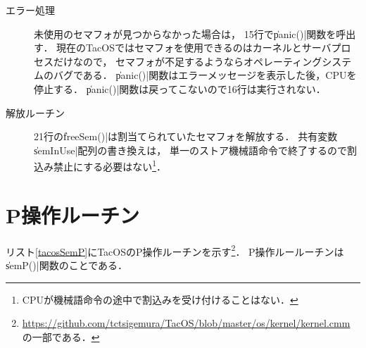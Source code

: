 \begin{description}
\item [エラー処理]
  未使用のセマフォが見つからなかった場合は，
  15行で\|panic()|関数を呼出す．
  現在のTacOSではセマフォを使用できるのはカーネルとサーバプロセスだけなので，
  セマフォが不足するようならオペレーティングシステムのバグである．
  \|panic()|関数はエラーメッセージを表示した後，CPUを停止する．
  \|panic()|関数は戻ってこないので16行は実行されない．

\item [解放ルーチン]
  21行の\|freeSem()|は割当てられていたセマフォを解放する．
  共有変数\|semInUse|配列の書き換えは，
  単一のストア機械語命令で終了するので割込み禁止にする必要はない\footnote{
    CPUが機械語命令の途中で割込みを受け付けることはない．}．
\end{description}

\section{P操作ルーチン}
リスト\ref{tacosSemP}にTacOSのP操作ルーチンを示す\footnote{
  \url{https://github.com/tctsigemura/TacOS/blob/master/os/kernel/kernel.cmm}
  の一部である．}．
P操作ルールーチンは\|semP()|関数のことである．




